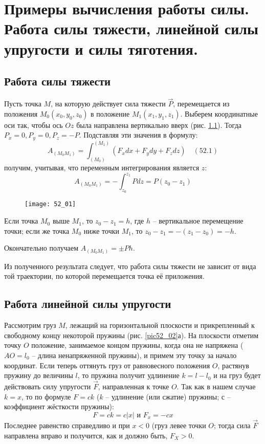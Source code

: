 \chapter{Примеры вычисления работы силы. Работа силы тяжести, линейной силы
упругости и силы тяготения.}

\section{Работа силы тяжести}
Пусть точка \( M \), на которую действует сила тяжести \( \vec{P} \), 
перемещается из положения \( M_0(x_0, y_0, z_0) \) в положение 
\( M_1(x_1, y_1, z_1) \). Выберем координатные оси так, чтобы ось \( Oz \) 
была направлена вертикально вверх (рис. \ref{pic52_01}). Тогда 
\( P_x = 0, P_y = 0, P_z = -P \). Подставляя эти значения в формулу:
\[ 
    A_{(M_0 M_1)} = \int_{(M_0)}^{(M_1)} 
    \left( F_x dx + F_y dy + F_z dz \right) \quad (52.1)
\]
получим, учитывая, что переменным интегрирования является \( z \):
\[ 
    A_{(M_0 M_1)} = - \int_{z_0}^{z_1} Pdz = 
    P\left(z_0 - z_1 \right) 
\]

\begin{figure}[h!]
    \texttt{[image: 52\_01]}
    \parbox{.47\textwidth}{\caption{} \label{pic52_01}}
\end{figure}

Если точка \( M_0 \) выше \( M_1 \), то \( z_0 - z_1 = h \), где 
\( h \) -- вертикальное перемещение точки; если же точка \( M_0 \) ниже 
точки \( M_1 \), то \( z_0 - z_1 = -\left(z_1 - z_0\right) = -h \).

Окончательно получаем \( A_{(M_0 M_1)} = \pm Ph \).

Из полученного результата следует, что работа силы тяжести не зависит от 
вида той траектории, по которой перемещается точка её приложения.

\section{Работа линейной силы упругости}
Рассмотрим груз \( M \), лежащий на горизонтальной плоскости и 
прикрепленный к свободному концу некоторой пружины (рис. \ref{pic52_02}а). На 
плоскости отметим точку \( O \) положение, занимаемое концом пружины, 
когда она не напряжена (\( AO = l_0 \) -- длина ненапряженной пружины), и 
примем эту точку за начало координат. Если теперь оттянуть груз от 
равновесного положения \( O \), растянув пружину до величины \( l \), то
пружина получит удлинение \( k = l - l_0 \) и на груз будет действовать 
силу упругости \( \vec{F} \), направленная к точке \( O \). Так как в 
нашем случае \( k = x \), то по формуле \( F = ck \) 
(\( k \) -- удлинение (или сжатие) пружины; \( с \) -- коэффициент 
жёсткости пружины):
\[ F = ck = c|x| \text{ и } F_x = -cx \]
Последнее равенство справедливо и при \( x < 0 \) 
(груз левее точки \( O \); тогда сила \( \vec{F} \) направлена вправо и 
получится, как и должно быть, \( F_X > 0 \).

